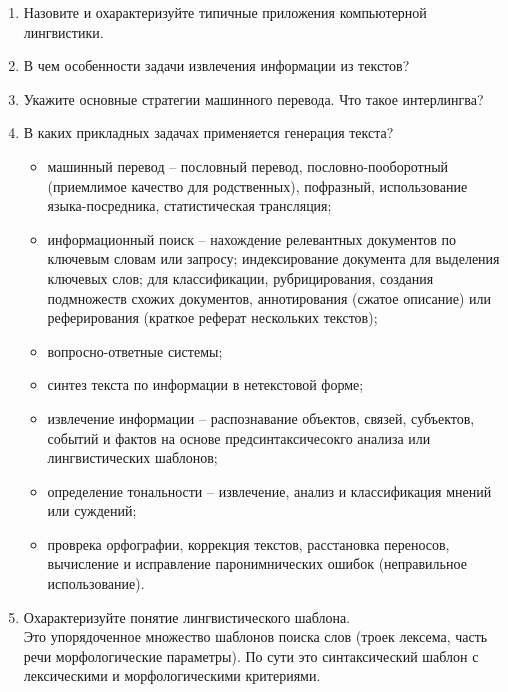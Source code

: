 \documentclass[a4paper]{article}
\begin{document}
\begin{enumerate}
	\item Назовите и охарактеризуйте типичные приложения компьютерной лингвистики.\hfill\\
	\item В чем особенности задачи извлечения информации из текстов?\hfill\\
	\item Укажите основные стратегии машинного перевода. Что такое интерлингва?\hfill\\
	\item В каких прикладных задачах применяется генерация текста?\hfill\\
	\begin{itemize}
		\item машинный перевод -- пословный перевод, пословно-пооборотный (приемлимое качество для родственных), пофразный, использование языка-посредника, статистическая трансляция;
		\item информационный поиск -- нахождение релевантных документов по ключевым словам или запросу; индексирование документа для выделения ключевых слов; для классификации, рубрицирования, создания подмножеств схожих документов, аннотирования (сжатое описание) или реферирования (краткое реферат нескольких текстов);
		\item вопросно-ответные системы;
		\item синтез текста по информации в нетекстовой форме;
		\item извлечение информации -- распознавание объектов, связей, субъектов, событий и фактов на основе предсинтаксичесокго анализа или лингвистических шаблонов;
		\item определение тональности -- извлечение, анализ и классификация мнений или суждений;
		\item проврека орфографии, коррекция текстов, расстановка переносов, вычисление и исправление паронимнических ошибок (неправильное использование).
	\end{itemize}

	\item Охарактеризуйте понятие лингвистического шаблона.\hfill\\
	Это упорядоченное множество шаблонов поиска слов (троек лексема, часть речи морфологические параметры). По сути это синтаксический шаблон с лексическими и морфологическими критериями.
\end{enumerate}
\end{document}
